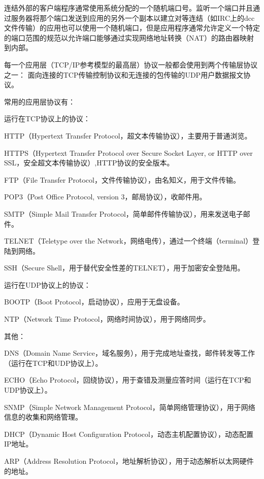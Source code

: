 连结外部的客户端程序通常使用系统分配的一个随机端口号。监听一个端口并且通过服务器将那个端口发送到应用的另外一个副本以建立对等连结（如IRC上的dcc文件传输）的应用也可以使用一个随机端口，但是应用程序通常允许定义一个特定的端口范围的规范以允许端口能够通过实现网络地址转换（NAT）的路由器映射到内部。

每一个应用层（TCP/IP参考模型的最高层）协议一般都会使用到两个传输层协议之一： 面向连接的TCP传输控制协议和无连接的包传输的UDP用户数据报文协议。

常用的应用层协议有：

\begin{compactitem}
\item 运行在TCP协议上的协议：

	\begin{compactitem}
	\item HTTP（Hypertext Transfer Protocol，超文本传输协议），主要用于普通浏览。
	\item HTTPS（Hypertext Transfer Protocol over Secure Socket Layer, or HTTP over SSL，安全超文本传输协议）,HTTP协议的安全版本。
	\item FTP（File Transfer Protocol，文件传输协议），由名知义，用于文件传输。
	\item POP3（Post Office Protocol, version 3，邮局协议），收邮件用。
	\item SMTP（Simple Mail Transfer Protocol，简单邮件传输协议），用来发送电子邮件。
	\item TELNET（Teletype over the Network，网络电传），通过一个终端（terminal）登陆到网络。
	\item SSH（Secure Shell，用于替代安全性差的TELNET），用于加密安全登陆用。
	\end{compactitem}
\item 运行在UDP协议上的协议：
	\begin{compactitem}
	\item BOOTP（Boot Protocol，启动协议），应用于无盘设备。
	\item NTP（Network Time Protocol，网络时间协议），用于网络同步。
	\end{compactitem}
\item 其他：
	\begin{compactitem}
	\item DNS（Domain Name Service，域名服务），用于完成地址查找，邮件转发等工作（运行在TCP和UDP协议上）。
	\item ECHO（Echo Protocol，回绕协议），用于查错及测量应答时间（运行在TCP和UDP协议上）。
	\item SNMP（Simple Network Management Protocol，简单网络管理协议），用于网络信息的收集和网络管理。
	\item DHCP（Dynamic Host Configuration Protocol，动态主机配置协议），动态配置IP地址。
	\item ARP（Address Resolution Protocol，地址解析协议），用于动态解析以太网硬件的地址。
	\end{compactitem}
\end{compactitem}






